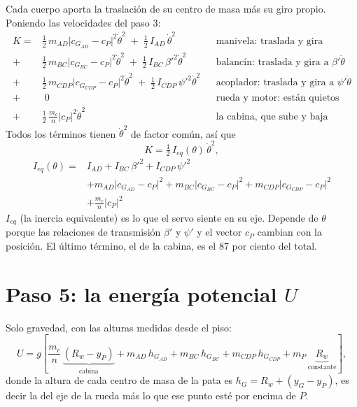 \documentclass[11pt,a4paper]{article}
\begin{document}
Cada cuerpo aporta la traslación de su centro de masa más su giro propio. Poniendo las velocidades del paso 3:
\begin{equation}
\begin{aligned}
K={}&\tfrac12\,m_{AD}\bigl|c_{G_{AD}}-c_P\bigr|^2\dot\theta^2 \;+\; \tfrac12\,I_{AD}\,\dot\theta^2
  &&\text{manivela: traslada y gira}\\
+{}&\tfrac12\,m_{BC}\bigl|c_{G_{BC}}-c_P\bigr|^2\dot\theta^2 \;+\; \tfrac12\,I_{BC}\,\beta'^2\dot\theta^2
  &&\text{balancín: traslada y gira a }\beta'\dot\theta\\
+{}&\tfrac12\,m_{CDP}\bigl|c_{G_{CDP}}-c_P\bigr|^2\dot\theta^2 \;+\; \tfrac12\,I_{CDP}\,\psi'^2\dot\theta^2
  &&\text{acoplador: traslada y gira a }\psi'\dot\theta\\
+{}&\;0
  &&\text{rueda y motor: están quietos}\\
+{}&\tfrac12\,\frac{m_c}{n}\bigl|c_P\bigr|^2\dot\theta^2
  &&\text{la cabina, que sube y baja}
\end{aligned}
\label{eq:K}
\end{equation}
Todos los términos tienen \(\dot\theta^2\) de factor común, así que
\begin{equation}
K=\tfrac12\,I_{eq}(\theta)\,\dot\theta^2,
\label{eq:KIeq}
\end{equation}
\begin{equation}
\boxed{\;
\begin{aligned}
I_{eq}(\theta)={}&I_{AD}+I_{BC}\,\beta'^2+I_{CDP}\,\psi'^2\\
&+m_{AD}\bigl|c_{G_{AD}}-c_P\bigr|^2+m_{BC}\bigl|c_{G_{BC}}-c_P\bigr|^2+m_{CDP}\bigl|c_{G_{CDP}}-c_P\bigr|^2\\
&+\frac{m_c}{n}\bigl|c_P\bigr|^2
\end{aligned}
\;}
\label{eq:Ieq}
\end{equation}
\(I_{eq}\) (la inercia equivalente) es lo que el servo siente en su eje. Depende de \(\theta\) porque las
relaciones de transmisión \(\beta'\) y \(\psi'\) y el vector \(c_P\) cambian con la posición. El último
término, el de la cabina, es el 87 por ciento del total.

\section{Paso 5: la energía potencial \(U\)}

Solo gravedad, con las alturas medidas desde el piso:
\begin{equation}
U=g\left[\frac{m_c}{n}\,\underbrace{(R_w-y_P)}_{\text{cabina}}
+m_{AD}\,h_{G_{AD}}+m_{BC}\,h_{G_{BC}}+m_{CDP}\,h_{G_{CDP}}
+m_P\,\underbrace{R_w}_{\text{constante}}\right],
\label{eq:U}
\end{equation}
donde la altura de cada centro de masa de la pata es \(h_G=R_w+(y_G-y_P)\), es decir la del eje de la rueda
más lo que ese punto esté por encima de \(P\).
\end{document}
